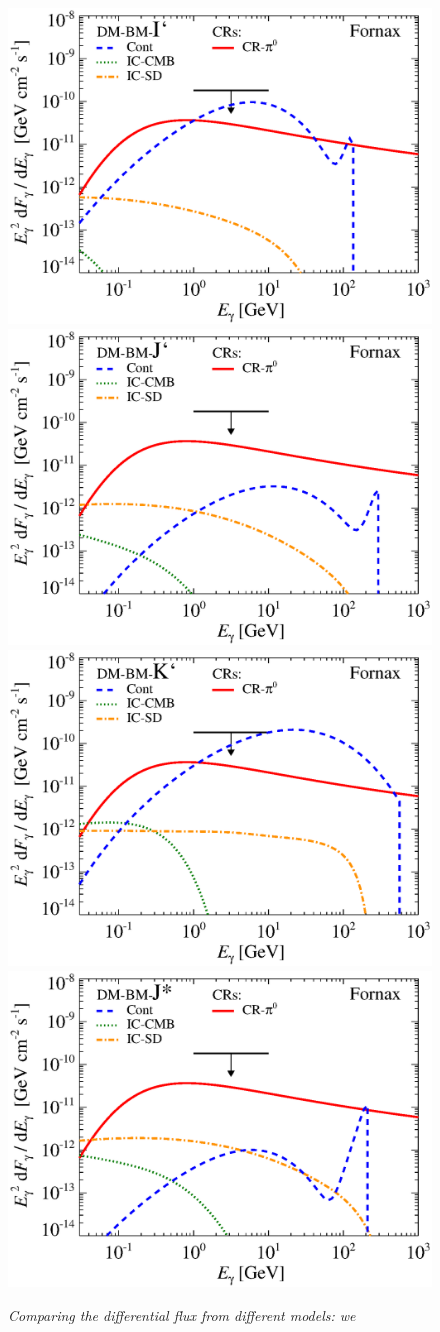 \documentclass[10pt,aps,pra,reprint,amsmath,amsfonts,amssymb,showpacs]{revtex4-1}
\begin{document}
\begin{figure}
\begin{minipage}{2.0\columnwidth}
 \includegraphics[width=0.49\columnwidth]{figures/flux.BMcompI.v9.0.1deg.1.6T.SubMass.IR2.noMW.woGal.eps}
\includegraphics[width=0.49\columnwidth]{figures/flux.BMcompJ.v9.0.1deg.1.6T.SubMass.IR2.noMW.woGal.eps}
\includegraphics[width=0.49\columnwidth]{figures/flux.BMcompK.v9.0.1deg.1.6T.SubMass.IR2.noMW.woGal.eps}
\includegraphics[width=0.49\columnwidth]{figures/flux.BMcompJs.v9.0.1deg.1.6T.SubMass.IR2.noMW.woGal.eps}
\caption{\it Comparing the differential flux from different models: we
}
\end{minipage}
\end{figure}
\end{document}
